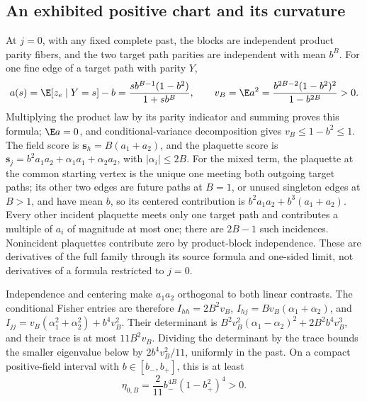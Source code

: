 \subsection{An exhibited positive chart and its curvature}
\label{sec:rg-spatial-proof-regular-chart}

At \(j=0\), with any fixed complete past, the blocks are independent
product parity fibers, and the two target path parities are independent
with mean \(b^B\). For one fine edge of a target path with parity \(Y\),
\begin{equation}
 a(s)=\E[z_e\mid Y=s]-b
      =\frac{sb^{B-1}(1-b^2)}{1+sb^B},\qquad
 v_B=\E a^2=\frac{b^{2B-2}(1-b^2)^2}{1-b^{2B}}>0.
 \label{eq:rg-spatial-proof-product-score-contrast}
\end{equation}
Multiplying the product law by its parity indicator and summing proves this
formula; \(\E a=0\), and conditional-variance decomposition gives
\(v_B\le1-b^2\le1\). The field score is \(\mathbf s_h=B(a_1+a_2)\), and the
plaquette score is \(\mathbf s_j=b^2a_1a_2+\alpha_1a_1+\alpha_2a_2\), with
\(|\alpha_i|\le2B\). For the mixed term, the plaquette at the common
starting vertex is the unique one meeting both outgoing target paths; its
other two edges are future paths at \(B=1\), or unused singleton edges at
\(B>1\), and have mean \(b\), so its centered contribution is
\(b^2a_1a_2+b^3(a_1+a_2)\). Every other incident plaquette meets only one
target path and contributes a multiple of \(a_i\) of magnitude at most one;
there are \(2B-1\) such incidences. Nonincident plaquettes contribute zero
by product-block independence. These are derivatives of the full family
through its source formula and one-sided limit, not derivatives of a
formula restricted to \(j=0\).

Independence and centering make \(a_1a_2\) orthogonal to both linear
contrasts. The conditional Fisher entries are therefore
\(I_{hh}=2B^2v_B\), \(I_{hj}=Bv_B(\alpha_1+\alpha_2)\), and
\(I_{jj}=v_B(\alpha_1^2+\alpha_2^2)+b^4v_B^2\). Their determinant is
\(B^2v_B^2(\alpha_1-\alpha_2)^2+2B^2b^4v_B^3\), and their trace is at most
\(11B^2v_B\). Dividing the determinant by the trace bounds the smaller
eigenvalue below by \(2b^4v_B^2/11\), uniformly in the past. On a compact
positive-field interval with \(b\in[b_-,b_+]\), this is at least
\begin{equation}
 \eta_{0,B}=\frac2{11}b_-^{4B}(1-b_+^2)^4>0.
 \label{eq:rg-spatial-proof-fisher-product-floor}
\end{equation}

